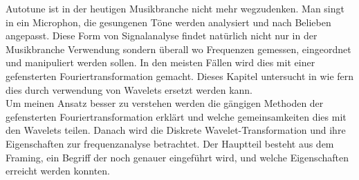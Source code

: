 Autotune ist in der heutigen Musikbranche nicht mehr wegzudenken. Man singt in ein Microphon, die gesungenen Töne werden analysiert und nach Belieben angepasst. Diese Form von Signalanalyse findet natürlich nicht nur in der Musikbranche Verwendung sondern überall wo Frequenzen gemessen, eingeordnet und manipuliert werden sollen. In den meisten Fällen wird dies mit einer gefensterten Fouriertransformation gemacht. Dieses Kapitel untersucht in wie fern dies durch verwendung von Wavelets ersetzt werden kann.\\
Um meinen Ansatz besser zu verstehen werden die gängigen Methoden der gefensterten Fouriertransformation erklärt und welche gemeinsamkeiten dies mit den Wavelets teilen. Danach wird die Diskrete Wavelet-Transformation und ihre Eigenschaften zur frequenzanalyse betrachtet. Der Hauptteil besteht aus dem Framing, ein Begriff der noch genauer eingeführt wird, und welche Eigenschaften erreicht werden konnten. 